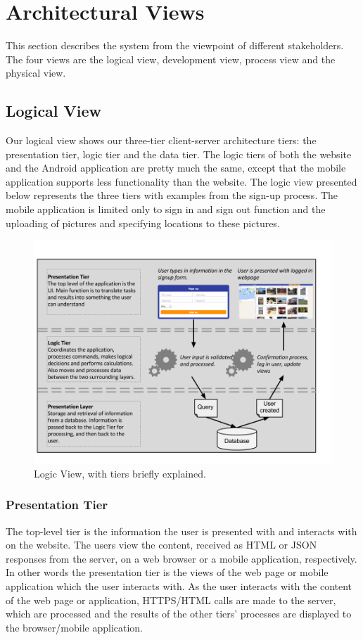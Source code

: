 \section{Architectural Views}
\label{sec:ArchViews}

This section describes the system from the viewpoint of different stakeholders. The four views are the logical view, development view, process view and the physical view. 


\subsection{Logical View}
\label{subsec:ArchViewsLogical}
Our logical view shows our three-tier client-server architecture tiers: the presentation tier, logic tier and the data tier. The logic tiers of both the website and the Android application are pretty much the same, except that the mobile application supports less functionality than the website. The logic view presented below represents the three tiers with examples from the sign-up process. The mobile application is limited only to sign in and sign out function and the uploading of pictures and specifying locations to these pictures.

\begin{figure}
\centering
\includegraphics[width=\linewidth]{./Architecture/img/LogicView.png}
\caption{Logic View, with tiers briefly explained. \label{overflow}}
\end{figure}

\subsubsection{Presentation Tier}
The top-level tier is the information the user is presented with and interacts with on the website. The users view the content, received as HTML or JSON responses from the server, on a web browser or a mobile application, respectively.  In other words the presentation tier is the views of the web page or mobile application which the user interacts with. As the user interacts with the content of the web page or application, HTTPS/HTML calls are made to the server, which are processed and the results of the other tiers' processes are displayed to the browser/mobile application.

